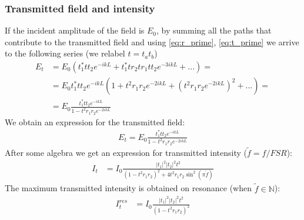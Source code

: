 \documentclass{article}
\numberwithin{equation}{section}
\begin{document}
\subsubsection{Transmitted field and intensity}
If the incident amplitude of the field is $E_0$, by summing all the paths that contribute to the transmitted field and using \ref{eq:r_prime}, \ref{eq:t_prime} we arrive to the following series (we relabel $t = t_a t_b$)
\begin{align*}
    E_t &= E_0 ( t_1^* t t_2 e^{-ikL} + t^*_1 t r_2 t r_1 t t_2 e^{-3ikL} + ...) = \\
    &= E_0 t_1^* t t_2 e^{-ikL} ( 1 + t^2 r_1 r_2 e^{-2ikL} + (t^2 r_1 r_2 e^{-2ikL})^2 + ... ) = \\
    &= E_0 \frac{t_1^* t t_2 e^{-ikL}}{1 - t^2 r_1 r_2 e^{-2ikL}}
\end{align*}
We obtain an expression for the transmitted field:
\begin{align}
    E_t = E_0 \frac{t_1^* t t_2 e^{-ikL}}{1 - t^2 r_1 r_2 e^{-2ikL}} \label{eq:E_t}
\end{align}
After some algebra we get an expression for transmitted intensity ($\tilde{f} = f/FSR$):
\begin{align}
    I_t &= I_0 \frac{|t_1|^2 |t_2|^2 t^2}{(1-t^2 r_1 r_2)^2 + 4 t^2 r_1 r_2 \sin^2 (\pi \tilde{f})}
\end{align}
The maximum transmitted intensity is obtained on resonance (when $\tilde{f} \in \mathbb{N}$):
\begin{align}
    I_t^{res} &= I_0 \frac{|t_1|^2 |t_2|^2 t^2}{(1 - t^2 r_1 r_2)^2}
\end{align}
\end{document}
